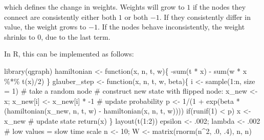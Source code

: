 \documentclass[
  a4paper,
  DIV=11,
  numbers=noendperiod,
  oneside]{scrreprt}
\newenvironment{Shaded}{}{}
\newcommand{\AttributeTok}[1]{\textcolor[rgb]{0.84,0.23,0.29}{#1}}
\newcommand{\CommentTok}[1]{\textcolor[rgb]{0.42,0.45,0.49}{#1}}
\newcommand{\ControlFlowTok}[1]{\textcolor[rgb]{0.84,0.23,0.29}{#1}}
\newcommand{\DecValTok}[1]{\textcolor[rgb]{0.00,0.36,0.77}{#1}}
\newcommand{\FunctionTok}[1]{\textcolor[rgb]{0.44,0.26,0.76}{#1}}
\newcommand{\NormalTok}[1]{\textcolor[rgb]{0.14,0.16,0.18}{#1}}
\newcommand{\OtherTok}[1]{\textcolor[rgb]{0.44,0.26,0.76}{#1}}
\newcommand{\SpecialCharTok}[1]{\textcolor[rgb]{0.00,0.36,0.77}{#1}}
\begin{document}
which defines the change in weights. Weights will grow to \(1\) if the
nodes they connect are consistently either both \(1\) or both \(-1\). If
they consistently differ in value, the weight grows to \(-1\). If the
nodes behave inconsistently, the weight shrinks to \(0\), due to the
last term.

In R, this can be implemented as follows:

\begin{Shaded}
\begin{Highlighting}[]
\FunctionTok{library}\NormalTok{(qgraph)}
\NormalTok{hamiltonian }\OtherTok{\textless{}{-}} \ControlFlowTok{function}\NormalTok{(x, n, t, w)\{}
    \SpecialCharTok{{-}}\FunctionTok{sum}\NormalTok{(t }\SpecialCharTok{*}\NormalTok{ x) }\SpecialCharTok{{-}} \FunctionTok{sum}\NormalTok{(w }\SpecialCharTok{*}\NormalTok{ x }\SpecialCharTok{\%*\%} \FunctionTok{t}\NormalTok{(x)}\SpecialCharTok{/}\DecValTok{2}\NormalTok{)}
\NormalTok{\}}
\NormalTok{glauber\_step  }\OtherTok{\textless{}{-}}  \ControlFlowTok{function}\NormalTok{(x, n, t, w, beta)\{}
\NormalTok{  i }\OtherTok{\textless{}{-}} \FunctionTok{sample}\NormalTok{(}\DecValTok{1}\SpecialCharTok{:}\NormalTok{n, }\AttributeTok{size =} \DecValTok{1}\NormalTok{) }\CommentTok{\# take a random node}
  \CommentTok{\# construct new state with flipped node:}
\NormalTok{  x\_new }\OtherTok{\textless{}{-}}\NormalTok{ x; x\_new[i] }\OtherTok{\textless{}{-}}\NormalTok{ x\_new[i] }\SpecialCharTok{*} \SpecialCharTok{{-}}\DecValTok{1} 
  \CommentTok{\# update probability}
\NormalTok{  p }\OtherTok{\textless{}{-}} \DecValTok{1}\SpecialCharTok{/}\NormalTok{(}\DecValTok{1} \SpecialCharTok{+} \FunctionTok{exp}\NormalTok{(beta }\SpecialCharTok{*}\NormalTok{ (}\FunctionTok{hamiltonian}\NormalTok{(x\_new, n, t, w) }\SpecialCharTok{{-}} 
                            \FunctionTok{hamiltonian}\NormalTok{(x, n, t, w))))  }
  \ControlFlowTok{if}\NormalTok{(}\FunctionTok{runif}\NormalTok{(}\DecValTok{1}\NormalTok{) }\SpecialCharTok{\textless{}}\NormalTok{ p) x }\OtherTok{\textless{}{-}}\NormalTok{ x\_new }\CommentTok{\# update state}
  \FunctionTok{return}\NormalTok{(x)}
\NormalTok{\}}
\FunctionTok{layout}\NormalTok{(}\FunctionTok{t}\NormalTok{(}\DecValTok{1}\SpecialCharTok{:}\DecValTok{2}\NormalTok{))}
\NormalTok{epsilon }\OtherTok{\textless{}{-}}\NormalTok{ .}\DecValTok{002}\NormalTok{; lambda }\OtherTok{\textless{}{-}}\NormalTok{ .}\DecValTok{002} \CommentTok{\# low values = slow time scale}
\NormalTok{n }\OtherTok{\textless{}{-}} \DecValTok{10}\NormalTok{; W }\OtherTok{\textless{}{-}} \FunctionTok{matrix}\NormalTok{(}\FunctionTok{rnorm}\NormalTok{(n}\SpecialCharTok{\^{}}\DecValTok{2}\NormalTok{, .}\DecValTok{0}\NormalTok{, .}\DecValTok{4}\NormalTok{), n, n)}

\end{Highlighting}
\end{Shaded}
\end{document}
